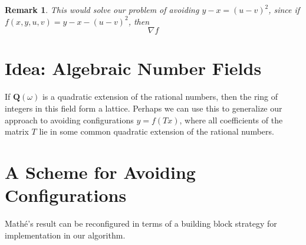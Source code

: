 \documentclass{report}
\theoremstyle{plain}
\theoremstyle{plain}
\newtheorem*{remark}{Remark}
\begin{document}
\begin{remark}
    This would solve our problem of avoiding $y - x = (u - v)^2$, since if $f(x,y,u,v) = y - x - (u - v)^2$, then
    \[ \nabla f \]
\end{remark}

\section{Idea: Algebraic Number Fields}

If $\mathbf{Q}(\omega)$ is a quadratic extension of the rational numbers, then the ring of integers in this field form a lattice. Perhaps we can use this to generalize our approach to avoiding configurations $y = f(Tx)$, where all coefficients of the matrix $T$ lie in some common quadratic extension of the rational numbers.

\section{A Scheme for Avoiding Configurations}

Math\'{e}'s result can be reconfigured in terms of a building block strategy for implementation in our algorithm.
\end{document}
